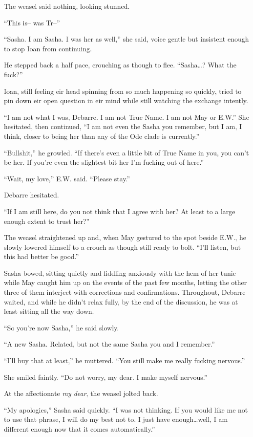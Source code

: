 The weasel said nothing, looking stunned.

``This is-- was Tr--''

``Sasha. I am Sasha. I was her as well,'' she said, voice gentle but insistent enough to stop Ioan from continuing.

He stepped back a half pace, crouching as though to flee. ``Sasha\ldots? What the fuck?''

Ioan, still feeling eir head spinning from so much happening so quickly, tried to pin down eir open question in eir mind while still watching the exchange intently.

``I am not what I was, Debarre. I am not True Name. I am not May or E.W.'' She hesitated, then continued, ``I am not even the Sasha you remember, but I am, I think, closer to being her than any of the Ode clade is currently.''

``Bullshit,'' he growled. ``If there's even a little bit of True Name in you, you can't be her. If you're even the slightest bit her I'm fucking out of here.''

``Wait, my love,'' E.W. said. ``Please stay.''

Debarre hesitated.

``If I am still here, do you not think that I agree with her? At least to a large enough extent to trust her?''

The weasel straightened up and, when May gestured to the spot beside E.W., he slowly lowered himself to a crouch as though still ready to bolt. ``I'll listen, but this had better be good.''

Sasha bowed, sitting quietly and fiddling anxiously with the hem of her tunic while May caught him up on the events of the past few months, letting the other three of them interject with corrections and confirmations. Throughout, Debarre waited, and while he didn't relax fully, by the end of the discussion, he was at least sitting all the way down.

``So you're now Sasha,'' he said slowly.

``A new Sasha. Related, but not the same Sasha you and I remember.''

``I'll buy that at least,'' he muttered. ``You still make me really fucking nervous.''

She smiled faintly. ``Do not worry, my dear. I make myself nervous.''

At the affectionate \emph{my dear}, the weasel jolted back.

``My apologies,'' Sasha said quickly. ``I was not thinking. If you would like me not to use that phrase, I will do my best not to. I just have enough\ldots well, I am different enough now that it comes automatically.''

